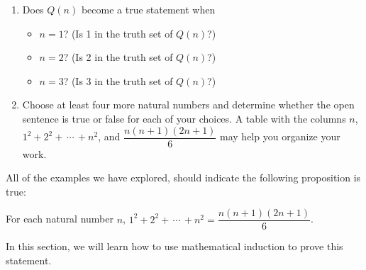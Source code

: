 \begin{previewactivity}
\setcounter{oldenumi}{\theenumi}
\begin{enumerate} \setcounter{enumi}{\theoldenumi}
\item Does $Q ( n )$ become a true statement when
\begin{itemize}
\item  $n = 1$?  (Is  1  in the truth set of $Q ( n )$?)

\item $n = 2$?  (Is  2  in the truth set of $Q ( n )$?)

\item $n = 3$?  (Is  3  in the truth set of $Q ( n )$?)
\end{itemize}

\item Choose at least four more natural numbers and determine whether the open sentence is true or false for each of your choices.  A table with the columns $n$, $1^2  + 2^2  + \, \cdots \, + n^2$, and $\dfrac{{n(n + 1)(2n + 1)}}{6}$ may help you organize your work.
\end{enumerate}
All of the examples we have explored, should indicate the following proposition is true:
\begin{center}
For each natural number  $n$,  $1^2  + 2^2  + \, \cdots \, + n^2  = \dfrac{{n(n + 1)(2n + 1)}}{6}$.
\end{center}
In this section, we will learn how to use mathematical induction to prove this statement.
\end{previewactivity}
\hbreak


\endinput
